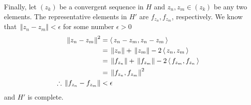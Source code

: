 \documentclass[10pt,a4paper]{report}
\newcommand{\NORM}[1]{\,\left \Vert #1 \right \Vert}
\begin{document}
Finally, let $(z_k)$ be a convergent sequence in $H$ and $z_n,z_m \in (z_k)$ be any two elements.  The representative elements in $H'$ are $f_{z_n}, f_{z_m}$, respectively.  We know that $\NORM{z_n - z_m} < \epsilon$ for some number $\epsilon > 0$
\begin{align*}
	\NORM{z_n - z_m}^2 &= \ABRACKET{z_n - z_m, z_n - z_m}\\
	&= \NORM{z_n}+\NORM{z_m} -2\ABRACKET{z_n,z_m} \\
	&= \NORM{f_{z_n}} + \NORM{f_{z_m}} -2\ABRACKET{f_{z_m}, f_{z_n}} \\
	&= \NORM{f_{z_n}, f_{z_m}}^2\\
	\therefore \NORM{f_{z_n}- f_{z_m}} &< \epsilon
\end{align*} and $H'$ is complete.
\end{document}
